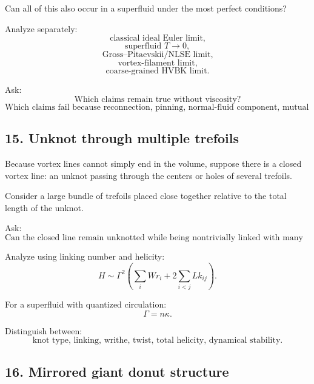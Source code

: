 \documentclass[11pt]{article}
\begin{document}
            Can all of this also occur in a superfluid under the most perfect conditions?
            
            Analyze separately:
            \[
                \text{classical ideal Euler limit,}
            \]
            \[
                \text{superfluid }T\rightarrow0,
            \]
            \[
                \text{Gross--Pitaevskii/NLSE limit,}
            \]
            \[
                \text{vortex-filament limit,}
            \]
            \[
                \text{coarse-grained HVBK limit.}
            \]
            
            Ask:
            \[
                \text{Which claims remain true without viscosity?}
            \]
            \[
                \text{Which claims fail because reconnection, pinning, normal-fluid component, mutual friction, boundary forcing, or quantization is required?}
            \]
        
        \subsection{15. Unknot through multiple trefoils}
            
            Because vortex lines cannot simply end in the volume, suppose there is a closed vortex line: an unknot passing through the centers or holes of several trefoils.
            
            Consider a large bundle of trefoils placed close together relative to the total length of the unknot.
            
            Ask:
            \[
                \text{Can the closed line remain unknotted while being nontrivially linked with many trefoils?}
            \]
            
            Analyze using linking number and helicity:
            \[
                H
                \sim
                \Gamma^2
                \left(
                    \sum_i Wr_i
                +
                2\sum_{i<j}Lk_{ij}
                \right).
            \]
            
            For a superfluid with quantized circulation:
            \[
                \Gamma=n\kappa.
            \]
            
            Distinguish between:
            \[
                \text{knot type, linking, writhe, twist, total helicity, dynamical stability.}
            \]
        
        \subsection{16. Mirrored giant donut structure}
            
\end{document}

